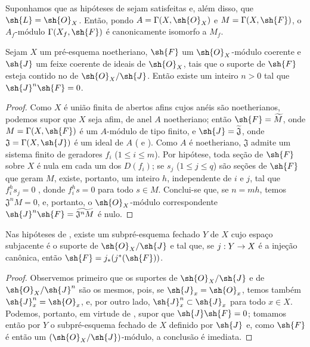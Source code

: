 \documentclass[oneside]{amsart}
\makeatletter
\renewcommand{\leq}{\leqslant}
\newcommand{\ega@arrow}[2]{\mathchoice{#1}{#2}{#2}{#2}}
\renewcommand{\to}{\ega@arrow{\longrightarrow}{\rightarrow}}
\let\EGAOriginalLabel\label
\renewcommand{\label}[1]{\phantomsection\EGAOriginalLabel{#1}}
\makeatother
\begin{document}
\begin{corollary}[9.3.3]
\label{I.9.3.3}
Suponhamos que as hipóteses de  sejam satisfeitas e, além disso, que
$\sh{L}=\sh{O}_X$. Então, pondo $A=\Gamma(X,\sh{O}_X)$ e $M=\Gamma(X,\sh{F})$, o $A_f$-módulo
$\Gamma(X_f,\sh{F})$ é canonicamente isomorfo a $M_f$.
\end{corollary}

\begin{proposition}[9.3.4]
\label{I.9.3.4}
Sejam $X$ um pré-esquema noetheriano, $\sh{F}$ um $\sh{O}_X$-módulo coerente e $\sh{J}$ um
feixe coerente de ideais de $\sh{O}_X$, tais que o suporte de $\sh{F}$ esteja contido no de
$\sh{O}_X/\sh{J}$. Então existe um inteiro $n>0$ tal que $\sh{J}^n\sh{F}=0$.
\end{proposition}

\begin{proof}
Como $X$ é união finita de abertos afins cujos anéis são noetherianos, podemos supor que
$X$ seja afim, de anel $A$ noetheriano; então $\sh{F}=\widetilde{M}$, onde
$M=\Gamma(X,\sh{F})$ é um $A$-módulo de tipo finito, e $\sh{J}=\widetilde{\mathfrak{J}}$,
onde $\mathfrak{J}=\Gamma(X,\sh{J})$ é um ideal de $A$ ( e
). Como $A$ é noetheriano, $\mathfrak{J}$ admite um sistema finito de
geradores $f_i$ ($1\leq i\leq m$). Por hipótese, toda seção de $\sh{F}$ sobre
$X$ é nula em cada um dos $D(f_i)$; se $s_j$ ($1\leq j\leq q$) são seções de
$\sh{F}$ que geram $M$, existe, portanto, um inteiro $h$, independente de $i$ e $j$,
tal que $f_i^h s_j=0$ , donde $f_i^h s=0$ para todo $s\in M$. Conclui-se
que, se $n=mh$, temos $\mathfrak{J}^n M=0$, e, portanto, o $\sh{O}_X$-módulo correspondente
$\sh{J}^n\sh{F}=\widetilde{\mathfrak{J}^n M}$  é nulo.
\end{proof}

\begin{corollary}[9.3.5]
\label{I.9.3.5}
Nas hipóteses de , existe um subpré-esquema fechado $Y$ de $X$ cujo
espaço subjacente é o suporte de $\sh{O}_X/\sh{J}$ e tal que, se $j:Y\to X$ é a
injeção canônica, então $\sh{F}=j_*(j^*(\sh{F}))$.
\end{corollary}

\begin{proof}
Observemos primeiro que os suportes de $\sh{O}_X/\sh{J}$ e de $\sh{O}_X/\sh{J}^n$ são
os mesmos, pois, se $\sh{J}_x=\sh{O}_x$, temos também $\sh{J}_x^n=\sh{O}_x$, e, por
outro lado, $\sh{J}_x^n\subset\sh{J}_x$ para todo $x\in X$. Podemos, portanto, em virtude
de , supor que $\sh{J}\sh{F}=0$; tomamos então por $Y$ o subpré-esquema
fechado de $X$ definido por $\sh{J}$ e, como $\sh{F}$ é então um
$(\sh{O}_X/\sh{J})$-módulo, a conclusão é imediata.
\end{proof}
\end{document}
